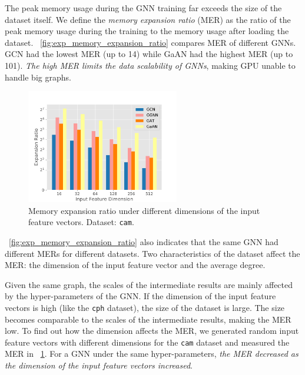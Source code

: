 The peak memory usage during the GNN training far exceeds the size of the dataset itself.
We define the \emph{memory expansion ratio} (MER) as the ratio of the peak memory usage during the training to the memory usage after loading the dataset.
\figurename~\ref{fig:exp_memory_expansion_ratio} compares MER of different GNNs.
GCN had the lowest MER (up to 14) while GaAN had the highest MER (up to 101).
\emph{The high MER limits the data scalability of GNNs}, making GPU unable to handle big graphs.

\begin{figure}
    \centering
    \includegraphics[height=5cm]{figs/experiments/exp_memory_expansion_ratio_input_feature_dimension_com-amazon.pdf}
    \caption{Memory expansion ratio under different dimensions of the input feature vectors. Dataset: \texttt{cam}.}
    \label{fig:exp_memory_expension_ratio_input_feature_dimension}
\end{figure}

\figurename~\ref{fig:exp_memory_expansion_ratio} also indicates that the same GNN had different MERs for different datasets.
Two characteristics of the dataset affect the MER: the dimension of the input feature vector and the average degree.

Given the same graph, the scales of the intermediate results are mainly affected by the hyper-parameters of the GNN.
If the dimension of the input feature vectors is high (like the \texttt{cph} dataset), the size of the dataset is large.
The size becomes comparable to the scales of the intermediate results,  making the MER low.
To find out how the dimension affects the MER, we generated random input feature vectors with different dimensions for the \texttt{cam} dataset and measured the MER in \figurename~\ref{fig:exp_memory_expension_ratio_input_feature_dimension}.
For a GNN under the same hyper-parameters, \emph{the MER decreased as the dimension of the input feature vectors increased}.

